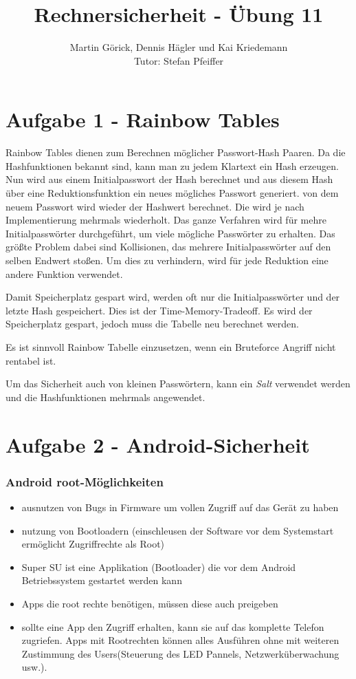 \documentclass{scrartcl}
\title{Rechnersicherheit - Übung 11}
\author{Martin Görick, Dennis Hägler und Kai Kriedemann \\ Tutor: Stefan Pfeiffer}
\begin{document}
\maketitle


\section*{Aufgabe 1 - Rainbow Tables}

Rainbow Tables dienen zum Berechnen möglicher Passwort-Hash Paaren.  Da die
Hashfunktionen bekannt sind, kann man zu jedem Klartext ein Hash erzeugen.  Nun
wird aus einem Initialpasswort der Hash berechnet und aus diesem Hash über eine
Reduktionsfunktion ein neues mögliches Passwort generiert.  von dem neuem
Passwort wird wieder der Hashwert berechnet.  Die wird je nach Implementierung
mehrmals wiederholt.  Das ganze Verfahren wird für mehre Initialpasswörter
durchgeführt, um viele mögliche Passwörter zu erhalten.  Das größte Problem
dabei sind Kollisionen, das mehrere Initialpasswörter auf den selben Endwert
stoßen.  Um dies zu verhindern, wird für jede Reduktion eine andere Funktion
verwendet.


Damit Speicherplatz gespart wird, werden oft nur die Initialpasswörter und der
letzte Hash gespeichert.  Dies ist der Time-Memory-Tradeoff.  Es wird der
Speicherplatz gespart, jedoch muss die Tabelle neu berechnet werden.


Es ist sinnvoll Rainbow Tabelle einzusetzen, wenn ein Bruteforce Angriff nicht
rentabel ist.


Um das Sicherheit auch von kleinen Passwörtern, kann ein \textit{Salt}
verwendet werden und die Hashfunktionen mehrmals angewendet.

\section*{Aufgabe 2 - Android-Sicherheit}
\subsubsection{Android root-Möglichkeiten}
\begin{itemize}
  \item ausnutzen von Bugs in Firmware um vollen Zugriff auf das Gerät zu haben
  \item nutzung von Bootloadern (einschleusen der Software vor dem Systemstart
    ermöglicht Zugriffrechte als Root)
  \item Super SU ist eine Applikation (Bootloader) die vor dem Android
    Betriebssystem gestartet werden kann
  \item Apps die root rechte benötigen, müssen diese auch preigeben
  \item sollte eine App den Zugriff erhalten, kann sie auf das komplette
    Telefon zugriefen. Apps mit Rootrechten können alles Ausführen ohne
    mit weiteren Zustimmung des Users(Steuerung des LED Pannels,
    Netzwerküberwachung usw.).
\end{itemize}
\end{document}
